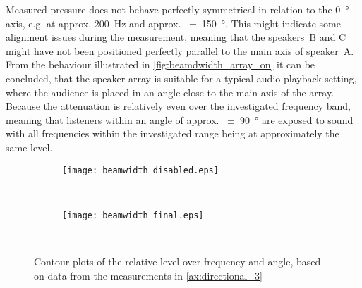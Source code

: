 Measured pressure does not behave perfectly symmetrical in relation to the \SI{0}{\degree} axis, e.g. at approx. \SI{200}{\hertz} and approx. \SI{\pm 150}{\degree}. This might indicate some alignment issues during the measurement, meaning that the speakers~B and C might have not been positioned perfectly parallel to the main axis of speaker~A.\\
From the behaviour illustrated in \autoref{fig:beamdwidth_array_on} it can be concluded, that the speaker array is suitable for a typical audio playback setting, where the audience is placed in an angle close to the main axis of the array. Because the attenuation is relatively even over the investigated frequency band, meaning that listeners within an angle of approx. \SI{\pm 90}{\degree} are exposed to sound with all frequencies within the investigated range being at approximately the same level.

\begin{figure}[h]
	\centering
	\begin{subfigure}[c]{\textwidth}
		\texttt{[image: beamwidth\_disabled.eps]}
		\label{fig:beamdwidth_array_off}
	\end{subfigure}\\
		\begin{subfigure}[c]{\textwidth}
		\texttt{[image: beamwidth\_final.eps]}
		\label{fig:beamdwidth_array_on}
	\end{subfigure}\\
	\caption{Contour plots of the relative level over frequency and angle, based on data from the measurements in \autoref{ax:directional_3}}
	\label{fig:beamwidth_array}
\end{figure}